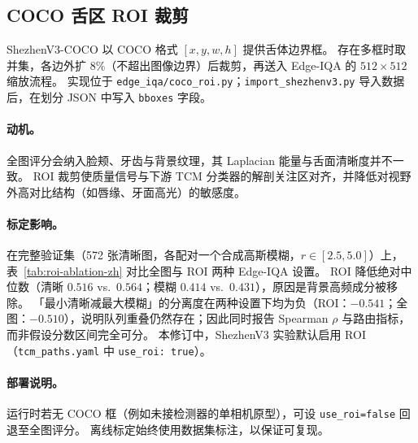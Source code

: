 \subsection{COCO 舌区 ROI 裁剪}
\label{sec:roi-zh}

ShezhenV3-COCO 以 COCO 格式 $[x,y,w,h]$ 提供舌体边界框。
存在多框时取并集，各边外扩 $8\%$（不超出图像边界）后裁剪，再送入 Edge-IQA 的 $512{\times}512$ 缩放流程。
实现位于 \texttt{edge\_iqa/coco\_roi.py}；\texttt{import\_shezhenv3.py} 导入数据后，在划分 JSON 中写入 \texttt{bboxes} 字段。

\paragraph{动机。}
全图评分会纳入脸颊、牙齿与背景纹理，其 Laplacian 能量与舌面清晰度并不一致。
ROI 裁剪使质量信号与下游 TCM 分类器的解剖关注区对齐，并降低对视野外高对比结构（如唇缘、牙面高光）的敏感度。

\paragraph{标定影响。}
在完整验证集（572 张清晰图，各配对一个合成高斯模糊，$r{\in}[2.5,5.0]$）上，表~\ref{tab:roi-ablation-zh} 对比全图与 ROI 两种 Edge-IQA 设置。
ROI 降低绝对中位数（清晰 $0.516$ vs.\ $0.564$；模糊 $0.414$ vs.\ $0.431$），原因是背景高频成分被移除。
「最小清晰减最大模糊」的分离度在两种设置下均为负（ROI：$-0.541$；全图：$-0.510$），说明队列重叠仍然存在；因此同时报告 Spearman $\rho$ 与路由指标，而非假设分数区间完全可分。
本修订中，ShezhenV3 实验默认启用 ROI（\texttt{tcm\_paths.yaml} 中 \texttt{use\_roi: true}）。

\begin{table}[t]
\centering
\caption{Edge-IQA 标定：全图 vs.\ COCO 舌区 ROI（ShezhenV3 val，每类 $n{=}572$）。}
\label{tab:roi-ablation-zh}
\small
{}
\end{table}

\paragraph{部署说明。}
运行时若无 COCO 框（例如未接检测器的单相机原型），可设 \texttt{use\_roi=false} 回退至全图评分。
离线标定始终使用数据集标注，以保证可复现。
